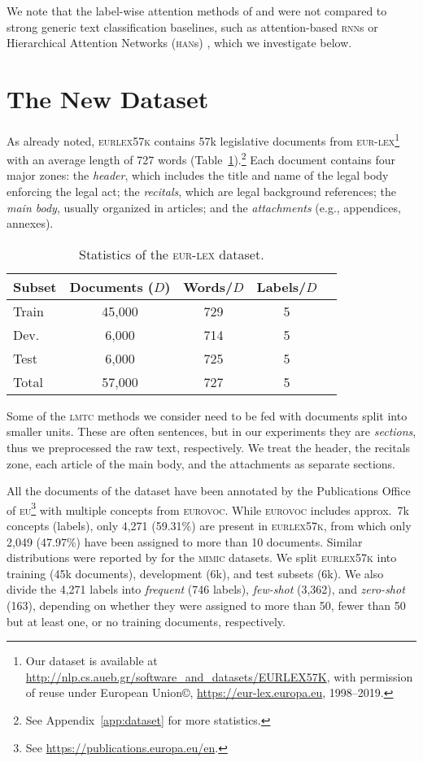 \documentclass[11pt,a4paper]{article}
\newcommand{\rnn}{\textsc{rnn}\xspace}
\newcommand{\han}{\textsc{han}\xspace}
\newcommand{\lmtc}{\textsc{lmtc}\xspace}
\newcommand{\newdata}{\textsc{eurlex57k}\xspace}
\newcommand{\eurovoc}{\textsc{eurovoc}\xspace}
\newcommand{\eu}{\textsc{eu}\xspace}
\newcommand{\eurlex}{\textsc{eur-lex}\xspace}
\begin{document}
We note that the label-wise attention methods of \citet{Mullenbach2018} and \citet{Rios2018-2} were not compared to strong generic text classification baselines, such as attention-based \rnn{s} \cite{You2018} or Hierarchical Attention Networks (\han{s}) \cite{Yang2016}, which we investigate below.

\section{The New Dataset}
\label{sec:dataset}

As already noted, \newdata contains 57k legislative documents from \eurlex\footnote{Our dataset is available at \url{http://nlp.cs.aueb.gr/software_and_datasets/EURLEX57K}, with permission of reuse under European Union\copyright, \url{https://eur-lex.europa.eu}, 1998--2019.} with an average length of 727 words (Table~\ref{tab:dataset}).\footnote{See Appendix~\ref{app:dataset} for more statistics.} Each document contains four major zones: the \emph{header}, which includes the title and name of the legal body enforcing the legal act; the \emph{recitals}, which are legal background references; the \emph{main body}, usually organized in articles; and the \emph{attachments} (e.g., appendices, annexes).

\begin{table}[t]
\centering
\footnotesize
\begin{tabular}{lcccc}
  Subset & Documents ($D$) & Words/$D$ & Labels/$D$ \\
\hline
  Train & 45,000 & 729  & 5\\
  Dev. & 6,000 & 714  & 5 \\
  Test & 6,000 & 725  & 5\\\hline
  Total & 57,000 & 727 & 5\\
  \hline
\end{tabular}
\caption{Statistics of the \textsc{\eurlex} dataset.}
\label{tab:dataset}
\end{table}

Some of the \lmtc methods we consider need to be fed with documents split into smaller units. These are often sentences, but in our experiments they are \emph{sections}, thus we preprocessed the raw text,  respectively. We treat the header, the recitals zone, each article of the main body, and the attachments as separate sections. 

All the documents of the dataset have been annotated by the Publications Office of \eu\footnote{See \url{https://publications.europa.eu/en}.} with multiple concepts from \eurovoc. 
While \eurovoc includes approx.\ 7k concepts (labels), only 4,271 (59.31\%) are present in \newdata, from which only 2,049 (47.97\%) have been assigned to more than 10 documents. Similar distributions were reported by \citet{Rios2018-2} for the \textsc{mimic} datasets.
We split \newdata into training (45k documents), development (6k), and test subsets (6k). We also divide the 4,271 labels into \emph{frequent} (746 labels), \emph{few-shot} (3,362), and \emph{zero-shot} (163), depending on whether they were assigned to more than 50, fewer than 50 but at least one, or no training documents, respectively.
\end{document}
